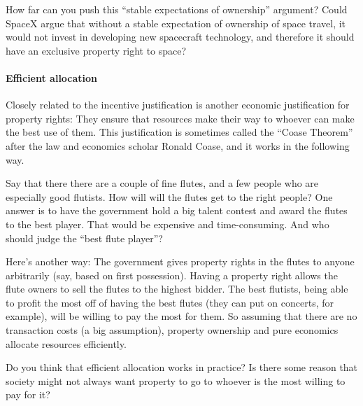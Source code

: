 How far can you push this ``stable expectations of ownership'' argument? Could
SpaceX argue that without a stable expectation of ownership of space travel, it
would not invest in developing new spacecraft technology, and therefore it
should have an exclusive property right to space?

\paragraph{Efficient allocation} Closely related to the incentive justification
is
another economic justification for property rights: They ensure that resources
make their way to whoever can make the best use of them. This justification is
sometimes called the ``Coase Theorem'' after the law and economics scholar
Ronald Coase, and it works in the following way.

Say that there there are a couple of fine flutes, and a few people who are
especially good flutists. How will will the flutes get to the right people? One
answer is to have the government hold a big talent contest and award the flutes
to the best player. That would be expensive and
time-consuming. And who should judge the ``best flute player''?

Here's another way: The government gives property rights in the flutes to
anyone arbitrarily (say, based on first possession). Having a property right
allows the flute owners to sell the flutes to the highest bidder. The best
flutists,
being able to profit the most off of having the best flutes (they can put on
concerts, for example), will be willing to pay the most for them. So assuming
that there are no transaction costs (a big assumption), property ownership and
pure economics allocate resources efficiently.

Do you think that efficient allocation works in practice? Is
there some reason that society might not always want property to go to whoever
is the most willing to pay for it?




